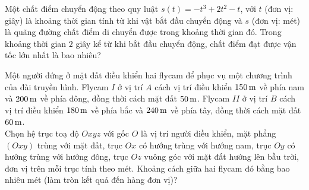 \begin{bt}%
	Một chất điểm chuyển động theo quy luật $s(t)=-t^3+2t^2-t$, với $t$ (đơn vị: giây) là khoảng thời gian tính từ khi vật bắt đầu chuyển động và $s$ (đơn vị: mét) là quãng đường chất điểm di chuyển được trong khoảng thời gian đó. Trong khoảng thời gian $2$ giây kể từ khi bắt đầu chuyển động, chất điểm đạt được vận tốc lớn nhất là bao nhiêu?
\end{bt}

\begin{bt}%
	Một người đứng ở mặt đất điều khiển hai flycam để phục vụ một chương trình của đài truyền hình. Flycam $I$ ở vị trí $A$ cách vị trí điều khiển $150\rm\,m$ về phía nam và $200\rm\,m$ về phía đông, đồng thời cách mặt đất $50\rm\,m$. Flycam $II$ ở vị trí $B$ cách vị trí điều khiển $180\rm\,m$ về phía bắc và $240\rm\,m$ về phía tây, đồng thời cách mặt đất $60\rm\,m$.\\
	Chọn hệ trục toạ độ $Oxyz$ với gốc $O$ là vị trí người điều khiển, mặt phẳng $(Oxy)$ trùng với mặt đất, trục $Ox$ có hướng trùng với hướng nam, trục $Oy$ có hướng trùng với hướng đông, trục $Oz$ vuông góc với mặt đất hướng lên bầu trời, đơn vị trên mỗi trục tính theo mét. Khoảng cách giữa hai flycam đó bằng bao nhiêu mét (làm tròn kết quả đến hàng đơn vị)?
\end{bt}

